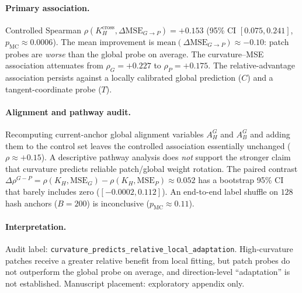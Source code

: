 \paragraph{Primary association.} Controlled Spearman $\rho(K_H^{\mathrm{cross}},\Delta\mathrm{MSE}_{G\to P}){=}+0.153$ (95\% CI $[0.075,0.241]$, $p_{\mathrm{MC}}{\approx}0.0006$). The mean improvement is $\mathrm{mean}(\Delta\mathrm{MSE}_{G\to P}){\approx}-0.10$: patch probes are \emph{worse} than the global probe on average. The curvature--MSE association attenuates from $\rho_G{=}+0.227$ to $\rho_P{=}+0.175$. The relative-advantage association persists against a locally calibrated global prediction ($C$) and a tangent-coordinate probe ($T$).

\paragraph{Alignment and pathway audit.} Recomputing current-anchor global alignment variables $A_H^G$ and $A_B^G$ and adding them to the control set leaves the controlled association essentially unchanged ($\rho{\approx}{+}0.15$). A descriptive pathway analysis does \emph{not} support the stronger claim that curvature predicts reliable patch/global weight rotation. The paired contrast $\Delta\rho^{G-P}=\rho(K_H,\mathrm{MSE}_G)-\rho(K_H,\mathrm{MSE}_P){\approx}0.052$ has a bootstrap 95\% CI that barely includes zero ($[-0.0002,0.112]$). An end-to-end label shuffle on $128$ hash anchors ($B{=}200$) is inconclusive ($p_{\mathrm{MC}}{\approx}0.11$).

\paragraph{Interpretation.} Audit label: \texttt{curvature\_predicts\_relative\_local\_adaptation}. High-curvature patches receive a greater relative benefit from local fitting, but patch probes do not outperform the global probe on average, and direction-level ``adaptation'' is not established. Manuscript placement: exploratory appendix only.
